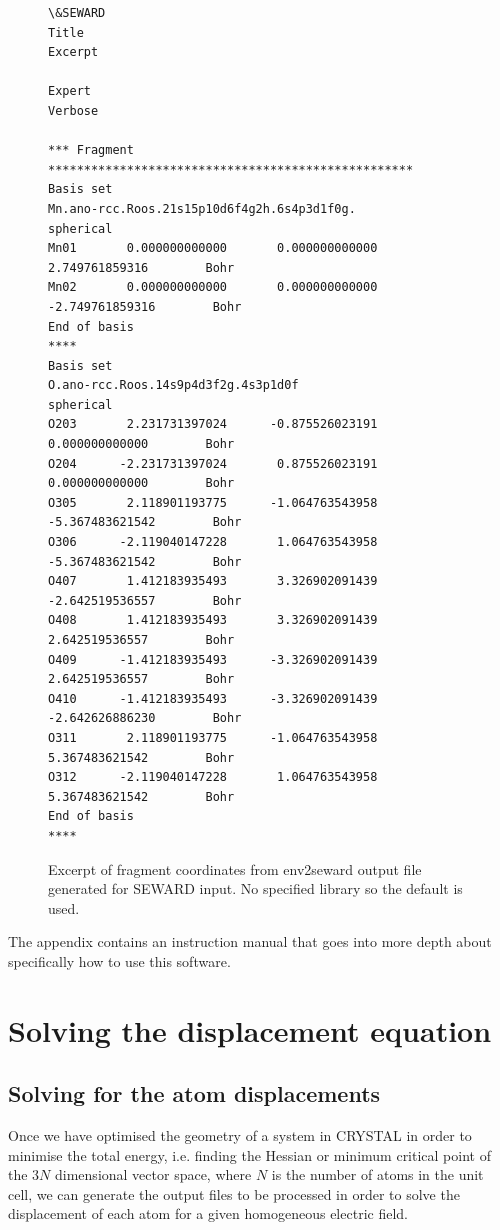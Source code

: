 \documentclass[10pt]{article}
\begin{document}
\begin{figure}
\centering
\begin{BVerbatim}[fontsize=\small]
\&SEWARD
Title
Excerpt

Expert
Verbose

*** Fragment ***************************************************
Basis set
Mn.ano-rcc.Roos.21s15p10d6f4g2h.6s4p3d1f0g.
spherical
Mn01       0.000000000000       0.000000000000       2.749761859316        Bohr
Mn02       0.000000000000       0.000000000000      -2.749761859316        Bohr
End of basis
****
Basis set
O.ano-rcc.Roos.14s9p4d3f2g.4s3p1d0f
spherical
O203       2.231731397024      -0.875526023191       0.000000000000        Bohr
O204      -2.231731397024       0.875526023191       0.000000000000        Bohr
O305       2.118901193775      -1.064763543958      -5.367483621542        Bohr
O306      -2.119040147228       1.064763543958      -5.367483621542        Bohr
O407       1.412183935493       3.326902091439      -2.642519536557        Bohr
O408       1.412183935493       3.326902091439       2.642519536557        Bohr
O409      -1.412183935493      -3.326902091439       2.642519536557        Bohr
O410      -1.412183935493      -3.326902091439      -2.642626886230        Bohr
O311       2.118901193775      -1.064763543958       5.367483621542        Bohr
O312      -2.119040147228       1.064763543958       5.367483621542        Bohr
End of basis
****
\end{BVerbatim}
\caption{Excerpt of fragment coordinates from env2seward output file generated for SEWARD input. No specified library so the default is used.}
\end{figure}

The appendix contains an instruction manual that goes into more depth about specifically how to use this software. 

\section{Solving the displacement equation}
\subsection{Solving for the atom displacements}

Once we have optimised the geometry of a system in CRYSTAL in order to minimise the total energy, i.e. finding the Hessian or minimum critical point of the $3N$ dimensional vector space, where $N$ is the number of atoms in the unit cell, we can generate the output files to be processed in order to solve the displacement of each atom for a given homogeneous electric field. 
\end{document}
